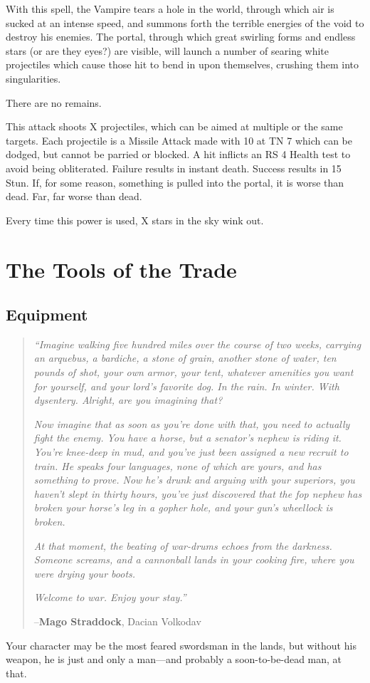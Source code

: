 \documentclass[oneside,11pt,english]{book}
\begin{document}
With this spell, the Vampire tears a hole in the world, through which air is sucked at an intense 
speed, and summons forth the terrible energies of the void to destroy his enemies. The portal, 
through which great swirling forms and endless stars (or are they eyes?) are visible, will launch 
a number of searing white projectiles which cause those hit to bend in upon themselves, 
crushing them into singularities. 

There are no remains. 

This attack shoots X projectiles, which can be aimed at multiple or the same targets. Each 
projectile is a Missile Attack made with 10 at TN 7 which can be dodged, but cannot be parried 
or blocked. A hit inflicts an RS 4 Health test to avoid being obliterated. Failure results in instant 
death. Success results in 15 Stun. 
If, for some reason, something is pulled into the portal, it is worse than dead. Far, far worse than 
dead. 

Every time this power is used, X stars in the sky wink out. 

\part[Gear and Equipment]{The Tools of the Trade}
\chapter{Equipment}\label{ch:equipment}
\clearpage
\begin{quotation}
  \emph{“Imagine walking five hundred miles over the course of two weeks,
    carrying an arquebus, a bardiche, a stone of grain, another stone of water,
    ten pounds of shot, your own armor, your tent, whatever amenities you want
    for yourself, and your lord’s favorite dog. In the rain. In winter. With
    dysentery. Alright, are you imagining that?} 

  \emph{Now imagine that as soon as you’re done with that, you need to actually
    fight the enemy. You have a horse, but a senator’s nephew is riding it.
    You’re knee-deep in mud, and you’ve just been assigned a new recruit to
    train. He speaks four languages, none of which are yours, and has something
    to prove. Now he’s drunk and arguing with your superiors, you haven’t slept
    in thirty hours, you’ve just discovered that the fop nephew has broken your
    horse’s leg in a gopher hole, and your gun’s wheellock is broken.} 

  \emph{At that moment, the beating of war-drums echoes from the darkness.
    Someone screams, and a cannonball lands in your cooking fire, where you were
    drying your boots.} 
  
  \emph{Welcome to war. Enjoy your stay.”}

  \hfill--\textbf{Mago Straddock}, Dacian Volkodav
\end{quotation}
Your character may be the most feared swordsman in the lands, but without his weapon, he is just and 
only a man—and probably a soon-to-be-dead man, at that. 
\end{document}
